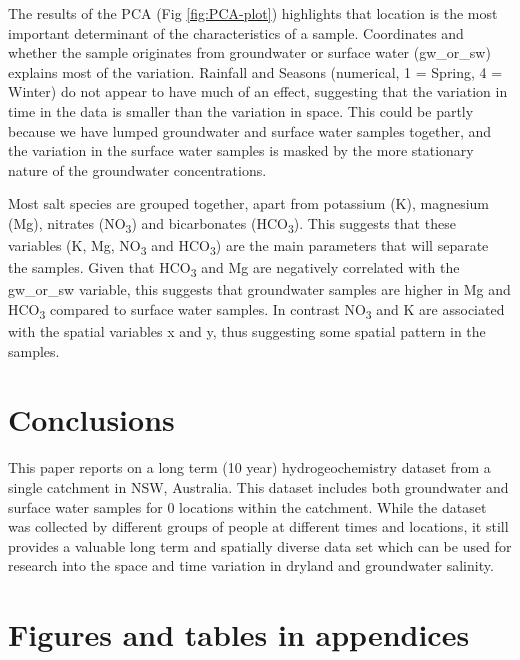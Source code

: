 \documentclass[, manuscript]{copernicus}
\begin{document}
The results of the PCA (Fig \ref{fig:PCA-plot}) highlights that location
is the most important determinant of the characteristics of a sample.
Coordinates and whether the sample originates from groundwater or
surface water (gw\_or\_sw) explains most of the variation. Rainfall and
Seasons (numerical, 1 = Spring, 4 = Winter) do not appear to have much
of an effect, suggesting that the variation in time in the data is
smaller than the variation in space. This could be partly because we
have lumped groundwater and surface water samples together, and the
variation in the surface water samples is masked by the more stationary
nature of the groundwater concentrations.

Most salt species are grouped together, apart from potassium (K),
magnesium (Mg), nitrates (NO\textsubscript{3}) and bicarbonates
(HCO\textsubscript{3}). This suggests that these variables (K, Mg,
NO\textsubscript{3} and HCO\textsubscript{3}) are the main parameters
that will separate the samples. Given that HCO\textsubscript{3} and Mg
are negatively correlated with the gw\_or\_sw variable, this suggests
that groundwater samples are higher in Mg and HCO\textsubscript{3}
compared to surface water samples. In contrast NO\textsubscript{3} and K
are associated with the spatial variables x and y, thus suggesting some
spatial pattern in the samples.

\section{Conclusions}

This paper reports on a long term (10 year) hydrogeochemistry dataset
from a single catchment in NSW, Australia. This dataset includes both
groundwater and surface water samples for 0 locations within the
catchment. While the dataset was collected by different groups of people
at different times and locations, it still provides a valuable long term
and spatially diverse data set which can be used for research into the
space and time variation in dryland and groundwater salinity.







\appendix
\section{Figures and tables in appendices}
\noappendix
\end{document}
